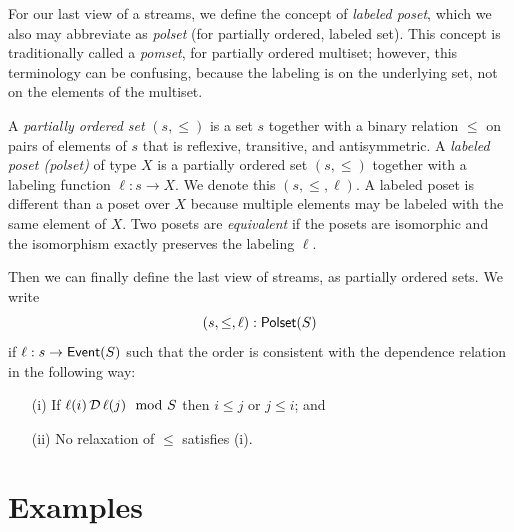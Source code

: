 For our last view of a streams, we define the concept of \emph{labeled poset}, which we also may abbreviate as \emph{polset} (for partially ordered, labeled set). This concept is traditionally called a \emph{pomset}, for partially ordered multiset; however, this terminology can be confusing, because the labeling is on the underlying set, not on the elements of the multiset.

A \emph{partially ordered set} $(s, \le)$ is a set $s$ together with a binary relation $\le$ on pairs of elements of $s$ that is reflexive, transitive, and antisymmetric.
A \emph{labeled poset (polset)} of type $X$ is a
partially ordered set $(s, \le)$ together with a labeling function $\ell: s \to X$.
We denote this $(s, \le, \ell)$. A labeled poset is different than a poset over $X$ because multiple elements may be labeled with the same element of $X$.
Two posets are \emph{equivalent} if the posets are isomorphic and the isomorphism exactly preserves the labeling $\ell$.

Then we can finally define the last view of streams, as partially ordered sets.
We write
\[
(s, \le, \ell): \mathsf{Polset}({S})
\]
if $\ell: s \to \mathsf{Event}(S)$ such that the order is consistent with the dependence
relation in the following way:
\begin{enumerate}
\item[(i)] If $\ell(i) \,\mathcal{D}\, \ell(j) \mod {S}$ then $i \le j$ or $j \le i$; and
\item[(ii)] No relaxation of $\le$ satisfies (i).
\end{enumerate}

\section{Examples}

